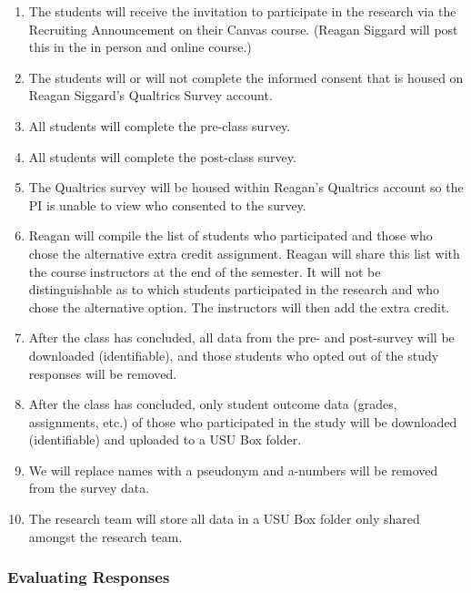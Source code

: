 \documentclass[
  12pt]{article}
\providecommand{\tightlist}{%
  \setlength{\itemsep}{0pt}\setlength{\parskip}{0pt}}
\begin{document}
\begin{enumerate}
\def\labelenumi{\arabic{enumi}.}
\tightlist
\item
  The students will receive the invitation to participate in the
  research via the Recruiting Announcement on their Canvas course.
  (Reagan Siggard will post this in the in person and online course.)
\item
  The students will or will not complete the informed consent that is
  housed on Reagan Siggard's Qualtrics Survey account.
\item
  All students will complete the pre-class survey.
\item
  All students will complete the post-class survey.
\item
  The Qualtrics survey will be housed within Reagan's Qualtrics account
  so the PI is unable to view who consented to the survey.
\item
  Reagan will compile the list of students who participated and those
  who chose the alternative extra credit assignment. Reagan will share
  this list with the course instructors at the end of the semester. It
  will not be distinguishable as to which students participated in the
  research and who chose the alternative option. The instructors will
  then add the extra credit.
\item
  After the class has concluded, all data from the pre- and post-survey
  will be downloaded (identifiable), and those students who opted out of
  the study responses will be removed.
\item
  After the class has concluded, only student outcome data (grades,
  assignments, etc.) of those who participated in the study will be
  downloaded (identifiable) and uploaded to a USU Box folder.
\item
  We will replace names with a pseudonym and a-numbers will be removed
  from the survey data.
\item
  The research team will store all data in a USU Box folder only shared
  amongst the research team.
\end{enumerate}

\subsubsection{Evaluating Responses}\label{evaluating-responses}
\end{document}
